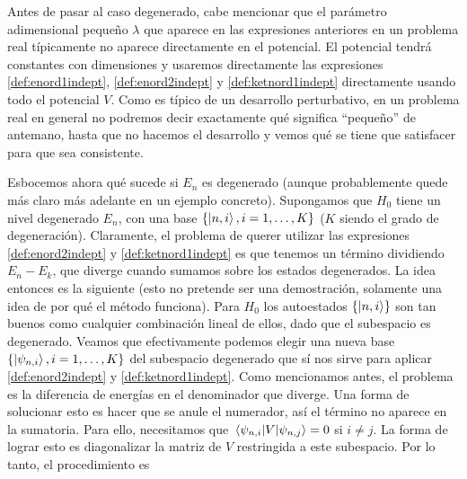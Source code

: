 \documentclass[10pt, a4paper]{article}
\numberwithin{equation}{subsection}
\begin{document}
\bigbreak

Antes de pasar al caso degenerado, cabe mencionar que el parámetro adimensional
pequeño $\lambda$ que aparece en las expresiones anteriores en un problema real
típicamente no aparece directamente en el potencial. El potencial tendrá
constantes con dimensiones y usaremos directamente las expresiones
\eqref{def:enord1indept}, \eqref{def:enord2indept} y \eqref{def:ketnord1indept}
directamente usando todo el potencial $V$. Como es típico de un desarrollo
perturbativo, en un problema real en general no podremos decir exactamente qué
significa ``pequeño'' de antemano, hasta que no hacemos el desarrollo y vemos
qué se tiene que satisfacer para que sea consistente.

\bigbreak

Esbocemos ahora qué sucede si $E_n$ es degenerado (aunque probablemente quede
más claro más adelante en un ejemplo concreto). Supongamos que $H_0$ tiene un
nivel degenerado $E_n$, con una base $\set{\ket{n,i}, i = 1,\dots,K}$ ($K$
siendo el grado de degeneración). Claramente, el problema de querer utilizar
las expresiones \eqref{def:enord2indept} y \eqref{def:ketnord1indept} es que
tenemos un término dividiendo $E_n - E_k$, que diverge cuando sumamos sobre los
estados degenerados. La idea entonces es la siguiente (esto no pretende ser una
demostración, solamente una idea de por qué el método funciona). Para $H_0$ los
autoestados $\set{\ket{n,i}}$ son tan buenos como cualquier combinación lineal
de ellos, dado que el subespacio es degenerado. Veamos que efectivamente
podemos elegir una nueva base $\set{\ket{\psi_{n,i}}, i=1,\dots,K}$ del
subespacio degenerado que sí nos sirve para aplicar \eqref{def:enord2indept} y
\eqref{def:ketnord1indept}. Como mencionamos antes, el problema es la
diferencia de energías en el denominador que diverge. Una forma de solucionar
esto es hacer que se anule el numerador, así el término no aparece en la
sumatoria. Para ello, necesitamos que $\matrixel{\psi_{n,i}}{V}{\psi_{n,j}} =
0$ si $i \neq j$. La forma de lograr esto es diagonalizar la matriz de $V$
restringida a este subespacio. Por lo tanto, el procedimiento es
\end{document}
